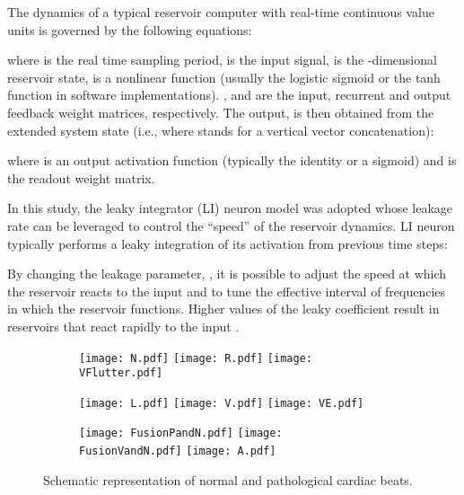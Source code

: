 \documentclass[review]{elsarticle}
\begin{document}
The dynamics of a typical reservoir computer with real-time continuous value units is governed by the following equations:


where  is the real time sampling period,  is the input signal,  is the -dimensional reservoir state,  is a nonlinear function (usually the logistic sigmoid or the tanh function in software implementations). ,  and  are the input, recurrent and output feedback weight matrices, respectively. The output,  is then obtained from the extended system state (i.e.,  where  stands for a vertical vector concatenation):


where  is an output activation function (typically the identity or a sigmoid) and  is the readout weight matrix.

In this study, the leaky integrator (LI) neuron model was adopted whose leakage rate can be leveraged to control the ``speed'' of the reservoir dynamics. LI neuron typically performs a leaky integration of its activation from previous time steps:

 

By changing the leakage parameter, , it is possible to adjust the speed at which the reservoir reacts to the input and to tune the effective interval of frequencies in which the reservoir functions. Higher values of the leaky coefficient result in reservoirs that react rapidly to the input \cite{jaeger2007optimization}.

\begin{figure*}
    \centering
    \begin{subfigure}[t!]{0.3\textwidth}
        \texttt{[image: N.pdf]}
        \texttt{[image: R.pdf]}
        \texttt{[image: VFlutter.pdf]}
        \end{subfigure}
    \centering
    \begin{subfigure}[t!]{0.3\textwidth}
    \texttt{[image: L.pdf]}
    \texttt{[image: V.pdf]}
    \texttt{[image: VE.pdf]}
   
\end{subfigure}
    \centering
    \begin{subfigure}[t!]{0.3\textwidth}
\texttt{[image: FusionPandN.pdf]}
        \texttt{[image: FusionVandN.pdf]}
         \texttt{[image: A.pdf]}
\end{subfigure}
    \caption{Schematic representation of normal and pathological cardiac beats.}
    \label{beatSample}
\end{figure*}
        
\end{document}
